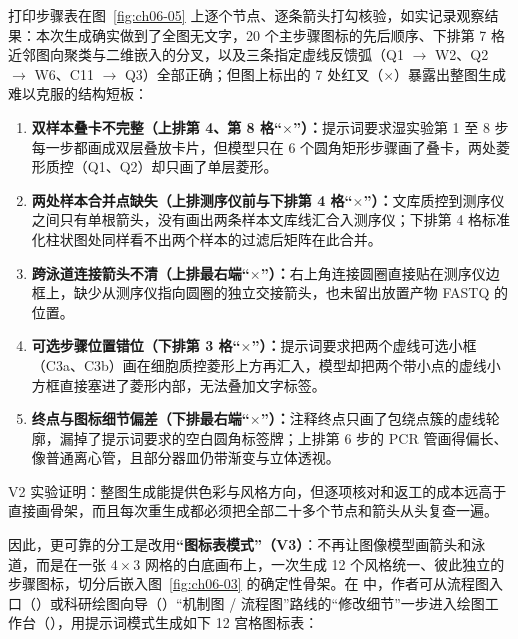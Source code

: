 打印步骤表在图~\ref{fig:ch06-05} 上逐个节点、逐条箭头打勾核验，如实记录观察结果：本次生成确实做到了全图无文字，20 个主步骤图标的先后顺序、下排第 7 格近邻图向聚类与二维嵌入的分叉，以及三条指定虚线反馈弧（Q1 $\rightarrow$ W2、Q2 $\rightarrow$ W6、C11 $\rightarrow$ Q3）全部正确；但图上标出的 7 处红叉（$\times$）暴露出整图生成难以克服的结构短板：
\begin{enumerate}
\item \textbf{双样本叠卡不完整（上排第 4、第 8 格“$\times$”）：}提示词要求湿实验第 1 至 8 步每一步都画成双层叠放卡片，但模型只在 6 个圆角矩形步骤画了叠卡，两处菱形质控（Q1、Q2）却只画了单层菱形。
\item \textbf{两处样本合并点缺失（上排测序仪前与下排第 4 格“$\times$”）：}文库质控到测序仪之间只有单根箭头，没有画出两条样本文库线汇合入测序仪；下排第 4 格标准化柱状图处同样看不出两个样本的过滤后矩阵在此合并。
\item \textbf{跨泳道连接箭头不清（上排最右端“$\times$”）：}右上角连接圆圈直接贴在测序仪边框上，缺少从测序仪指向圆圈的独立交接箭头，也未留出放置产物 FASTQ 的位置。
\item \textbf{可选步骤位置错位（下排第 3 格“$\times$”）：}提示词要求把两个虚线可选小框（C3a、C3b）画在细胞质控菱形上方再汇入，模型却把两个带小点的虚线小方框直接塞进了菱形内部，无法叠加文字标签。
\item \textbf{终点与图标细节偏差（下排最右端“$\times$”）：}注释终点只画了包绕点簇的虚线轮廓，漏掉了提示词要求的空白圆角标签牌；上排第 6 步的 PCR 管画得偏长、像普通离心管，且部分器皿仍带渐变与立体透视。
\end{enumerate}

V2 实验证明：整图生成能提供色彩与风格方向，但逐项核对和返工的成本远高于直接画骨架，而且每次重生成都必须把全部二十多个节点和箭头从头复查一遍。

因此，更可靠的分工是改用\textbf{“图标表模式”（V3）}：不再让图像模型画箭头和泳道，而是在一张 $4 \times 3$ 网格的白底画布上，一次生成 12 个风格统一、彼此独立的步骤图标，切分后嵌入图~\ref{fig:ch06-03} 的确定性骨架。在 \scidraw{} 中，作者可从流程图入口（）或科研绘图向导（）“机制图 / 流程图”路线的“修改细节”一步进入绘图工作台（），用提示词模式生成如下 12 宫格图标表：

